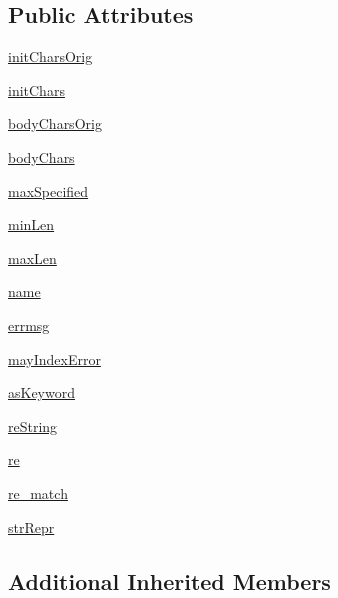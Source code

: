 \subsection*{Public Attributes}
\begin{DoxyCompactItemize}
\item 
\hyperlink{classpyparsing_1_1Word_ab7ea5f88d8cc07ed45f93b07fffbc63d}{init\+Chars\+Orig}
\item 
\hyperlink{classpyparsing_1_1Word_a2fb25b4ca971b367f234ee8a44a9432e}{init\+Chars}
\item 
\hyperlink{classpyparsing_1_1Word_a6d67e68362de8cecfbc957288a2b4d39}{body\+Chars\+Orig}
\item 
\hyperlink{classpyparsing_1_1Word_a73973900a299477092ad491ebbccca80}{body\+Chars}
\item 
\hyperlink{classpyparsing_1_1Word_a97f03e5f7ff7b5226dadb00ef03ce7a3}{max\+Specified}
\item 
\hyperlink{classpyparsing_1_1Word_a458e9763856de10294585a0ccc3499fd}{min\+Len}
\item 
\hyperlink{classpyparsing_1_1Word_a7a963f90af256ffea676cdebda38ca49}{max\+Len}
\item 
\hyperlink{classpyparsing_1_1Word_ae3f9469d861b350b458f753ffb7c1cbf}{name}
\item 
\hyperlink{classpyparsing_1_1Word_a10b776b309df29a31a94559da4076049}{errmsg}
\item 
\hyperlink{classpyparsing_1_1Word_a4632f23e3a17a9d31bb6899bb71e1d32}{may\+Index\+Error}
\item 
\hyperlink{classpyparsing_1_1Word_aeb1c56e9084057c44b019c202b018fb1}{as\+Keyword}
\item 
\hyperlink{classpyparsing_1_1Word_a4c14449480969cad75536fffde5eabd7}{re\+String}
\item 
\hyperlink{classpyparsing_1_1Word_a5cd690a50cf99c9f31ae41d370d69f9c}{re}
\item 
\hyperlink{classpyparsing_1_1Word_af5bc24e8d6ab1ec7bb97b6f14824e6bf}{re\+\_\+match}
\item 
\hyperlink{classpyparsing_1_1Word_aa71d342af79656a2a2f0737518f1ef28}{str\+Repr}
\end{DoxyCompactItemize}
\subsection*{Additional Inherited Members}


